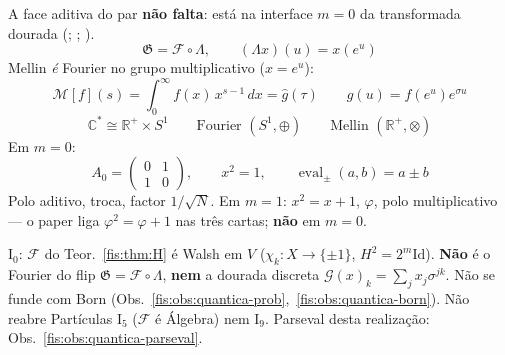 \documentclass[livro.tex]{subfiles}
\begin{document}
\begin{observacao}[interface \(m=0\): Fourier aditivo, Mellin multiplicativo]\label{fis:obs:quantica-dourada-m0}
A face aditiva do par \textbf{não falta}: está na interface
\(m=0\) da transformada dourada
(;
;
).
\[
\boxed{\;
\mathfrak{G}=\mathcal{F}\circ\Lambda,\qquad
(\Lambda x)(u)=x(e^{u})
\;}
\]
Mellin \emph{é} Fourier no grupo multiplicativo
(\(x=e^{u}\)):
\[
\boxed{\;
\mathcal{M}[f](s)
=\int_{0}^{\infty}f(x)\,x^{s-1}\,dx
=\widehat{g}(\tau)
\qquad
g(u)=f(e^{u})e^{\sigma u}
\;}
\]
\[
\boxed{\;
\mathbb{C}^{*}\cong\mathbb{R}^{+}\times S^{1}
\qquad
\text{Fourier }(S^{1},\oplus)
\qquad
\text{Mellin }(\mathbb{R}^{+},\otimes)
\;}
\]
Em \(m=0\):
\[
\boxed{\;
A_{0}=\begin{pmatrix}0&1\\1&0\end{pmatrix},\qquad
x^{2}=1,\qquad
\operatorname{eval}_{\pm}(a,b)=a\pm b
\;}
\]
Polo aditivo, troca, factor \(1/\sqrt{N}\).
Em \(m=1\): \(x^{2}=x+1\), \(\varphi\), polo
multiplicativo --- o paper liga \(\varphi^{2}=\varphi+1\)
nas três cartas; \textbf{não} em \(m=0\).

\(\mathrm{I}_{0}\): \(\mathcal{F}\) do Teor.~\ref{fis:thm:H}
é Walsh em \(V\) (\(\chi_{k}\colon X\to\{\pm1\}\),
\(H^{2}=2^{m}\mathrm{Id}\)).
\textbf{Não} é o Fourier do flip
\(\mathfrak{G}=\mathcal{F}\circ\Lambda\),
\textbf{nem} a dourada discreta
\(\mathcal{G}(x)_{k}=\sum_{j}x_{j}\sigma^{jk}\).
Não se funde com Born
(Obs.~\ref{fis:obs:quantica-prob},~\ref{fis:obs:quantica-born}).
Não reabre Partículas \(\mathrm{I}_{5}\)
(\(\mathcal{F}\) é Álgebra) nem \(\mathrm{I}_{9}\).
Parseval desta realização:
Obs.~\ref{fis:obs:quantica-parseval}.
\end{observacao}
\end{document}
